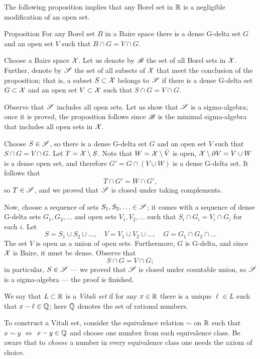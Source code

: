 The following proposition implies that any Borel set in $\mathbb{R}$ is a negligible modification of an open set.

\begin{thm}{Proposition}\label{prop:B=GnV}
For any Borel set $B$ in a Baire space there is a dense G-delta set $G$ and an open set $V$ such that $B\cap G=V\cap G$.
\end{thm}

Choose a Baire space $\mathcal{X}$.
Let us denote by $\mathscr{B}$ the set of all Borel sets in $\mathcal{X}$.
Further, denote by $\mathscr{S}$ the set of all subsets of $\mathcal{X}$ that meet the conclusion of the proposition;
that is, a subset $S\subset \mathcal{X}$ belongs to $\mathscr{S}$ if there is a dense G-delta set $G\subset\mathcal{X} $ and an open set $V\subset\mathcal{X}$ such that $S\cap G=V\cap G$.

Observe that $\mathscr{S}$ includes all open sets.
Let us show that $\mathscr{S}$ is a sigma-algebra;
once it is proved, the proposition follows since $\mathscr{B}$ is the minimal sigma-algebra that includes all open sets in $\mathcal{X}$.

Choose $S\in \mathscr{S}$, so there is a dense G-delta set $G$ and an open set $V$ such that $S\cap G=V\cap G$.
Let $T=\mathcal{X}\setminus S$.
Note that $W=\mathcal{X}\setminus \bar V$ is open, $\mathcal{X}\setminus\partial V=V\cup W$ is a dense open set, and therefore $G'=G\cap (V\cup W)$ is a dense G-delta set.
It follows that
\[T\cap G'=W\cap G',\]
so $T\in \mathscr{S}$, and we proved that $\mathscr{S}$ is closed under taking complements.

Now, choose a sequence of sets $S_1,S_2,\ldots\in \mathscr{S}$; it comes with a sequence of dense G-delta sets $G_1,G_2,\ldots$ and open sets $V_1,V_2,\dots$ such that $S_i\cap G_i=V_i\cap G_i$ for each $i$.
Let
\[
S=S_1\cup S_2\cup \ldots,\quad
V=V_1\cup V_2\cup \ldots,\quad
G=G_1\cap G_2\cap \ldots
\]
The set $V$ is open as a union of open sets.
Furthermore, $G$ is G-delta, and since $\mathcal{X}$ is Baire, it must be dense.
Observe that
\[S\cap G=V\cap G;\]
in particular, $S\in \mathscr{S}$ --- we proved that $\mathscr{S}$ is closed under countable union, so $\mathscr{S}$ is a sigma-algebra --- the proof is finished.
\qeds

We say that $L\subset\mathbb{R}$ is a \emph{Vitali set} if for any $x\in\mathbb{R}$ there is a unique $\ell\in L$ such that $x-\ell\in \mathbb{Q}$; here $\mathbb{Q}$ denotes the set of rational numbers.

To construct a Vitali set, consider the equivalence relation $\sim$ on $\mathbb{R}$ such that $x\sim y$ $\Leftrightarrow$ $x-y\in \mathbb{Q}$
and choose one number from each equivalence class.
Be aware that to \textit{choose} a number in every equivalence class one needs the axiom of choice.

